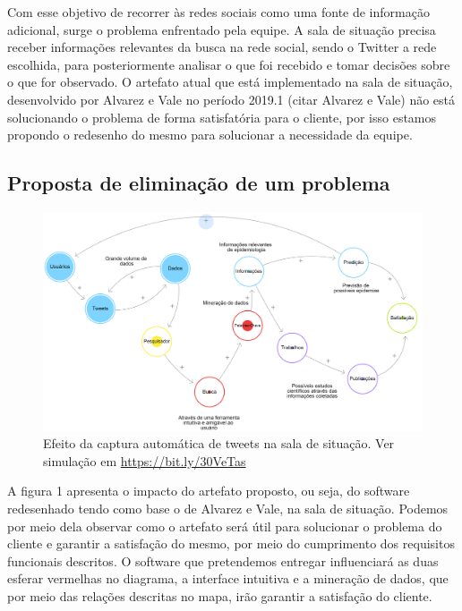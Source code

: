\documentclass[12pt]{article}
\newcommand{\rascbegin}{\color{red}}    %
\newcommand{\rascend}{\color{black}}    %
\begin{document}
	Com esse objetivo de recorrer às redes sociais como uma fonte de informação adicional, surge o problema enfrentado pela equipe. A sala de situação precisa receber informações relevantes da busca na rede social, sendo o Twitter a rede escolhida, para posteriormente analisar o que foi recebido e tomar decisões sobre o que for observado. O artefato atual que está implementado na sala de situação, desenvolvido por Alvarez e Vale no período 2019.1 \rascbegin(citar Alvarez e Vale) \rascend não está solucionando o problema de forma satisfatória para o cliente, por isso estamos propondo o redesenho do mesmo para solucionar a necessidade da equipe.
	
	
	
	\subsection{Proposta de eliminação de um problema}
    
    \begin{figure}[ht]
    \centering\includegraphics[width=1\textwidth]{media/diagrama_causal.png}
    \caption{Efeito da captura automática de tweets na sala de situação. Ver simulação em \url{https://bit.ly/30VeTas}\label{causal1:solucao}}
    \end{figure}
    
    
    A figura 1 apresenta o impacto do artefato proposto, ou seja, do software redesenhado tendo como base o de Alvarez e Vale, na sala de situação. Podemos por meio dela observar como o artefato será útil para solucionar o problema do cliente e garantir a satisfação do mesmo, por meio do cumprimento dos requisitos funcionais descritos. O software que pretendemos entregar influenciará as duas esferar vermelhas no diagrama, a interface intuitiva e a mineração de dados, que por meio das relações descritas no mapa, irão garantir a satisfação do cliente.
    
\end{document}
